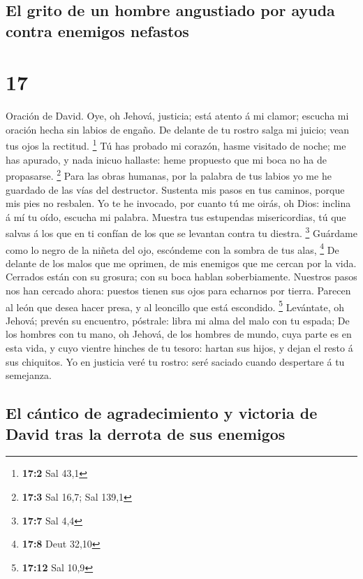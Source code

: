 \hypertarget{el-grito-de-un-hombre-angustiado-por-ayuda-contra-enemigos-nefastos}{%
\subsection{El grito de un hombre angustiado por ayuda contra enemigos
nefastos}\label{el-grito-de-un-hombre-angustiado-por-ayuda-contra-enemigos-nefastos}}

\hypertarget{section-16}{%
\section{17}\label{section-16}}

 Oración de David. Oye, oh Jehová, justicia; está atento á
mi clamor; escucha mi oración hecha sin labios de engaño. 
De delante de tu rostro salga mi juicio; vean tus ojos la rectitud.
\footnote{\textbf{17:2} Sal 43,1}  Tú has probado mi
corazón, hasme visitado de noche; me has apurado, y nada inicuo
hallaste: heme propuesto que mi boca no ha de propasarse. \footnote{\textbf{17:3}
  Sal 16,7; Sal 139,1}  Para las obras humanas, por la
palabra de tus labios yo me he guardado de las vías del destructor.
 Sustenta mis pasos en tus caminos, porque mis pies no
resbalen.  Yo te he invocado, por cuanto tú me oirás, oh
Dios: inclina á mí tu oído, escucha mi palabra.  Muestra tus
estupendas misericordias, tú que salvas á los que en ti confían de los
que se levantan contra tu diestra. \footnote{\textbf{17:7} Sal 4,4}
 Guárdame como lo negro de la niñeta del ojo, escóndeme con
la sombra de tus alas, \footnote{\textbf{17:8} Deut 32,10} 
De delante de los malos que me oprimen, de mis enemigos que me cercan
por la vida.  Cerrados están con su grosura; con su boca
hablan soberbiamente.  Nuestros pasos nos han cercado
ahora: puestos tienen sus ojos para echarnos por tierra. 
Parecen al león que desea hacer presa, y al leoncillo que está
escondido. \footnote{\textbf{17:12} Sal 10,9}  Levántate,
oh Jehová; prevén su encuentro, póstrale: libra mi alma del malo con tu
espada;  De los hombres con tu mano, oh Jehová, de los
hombres de mundo, cuya parte es en esta vida, y cuyo vientre hinches de
tu tesoro: hartan sus hijos, y dejan el resto á sus chiquitos.
 Yo en justicia veré tu rostro: seré saciado cuando
despertare á tu semejanza.

\hypertarget{el-cuxe1ntico-de-agradecimiento-y-victoria-de-david-tras-la-derrota-de-sus-enemigos}{%
\subsection{El cántico de agradecimiento y victoria de David tras la
derrota de sus
enemigos}\label{el-cuxe1ntico-de-agradecimiento-y-victoria-de-david-tras-la-derrota-de-sus-enemigos}}

